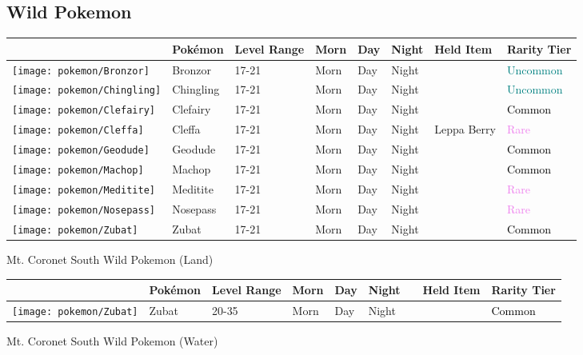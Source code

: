 \subsection{Wild Pokemon}%
\label{subsec:WildPokemon}%
\begin{longtable}{||l l l l l l l l||}%
\hline%
&Pokémon&Level Range&Morn&Day&Night&Held Item&Rarity Tier\\%
\hline%
\endhead%
\hline%
\texttt{[image: pokemon/Bronzor]}&Bronzor&17{-}21&Morn&Day&Night&&\textcolor{teal}{%
Uncommon%
}\\%
\hline%
\texttt{[image: pokemon/Chingling]}&Chingling&17{-}21&Morn&Day&Night&&\textcolor{teal}{%
Uncommon%
}\\%
\hline%
\texttt{[image: pokemon/Clefairy]}&Clefairy&17{-}21&Morn&Day&Night&&\textcolor{black}{%
Common%
}\\%
\hline%
\texttt{[image: pokemon/Cleffa]}&Cleffa&17{-}21&Morn&Day&Night&Leppa Berry&\textcolor{violet}{%
Rare%
}\\%
\hline%
\texttt{[image: pokemon/Geodude]}&Geodude&17{-}21&Morn&Day&Night&&\textcolor{black}{%
Common%
}\\%
\hline%
\texttt{[image: pokemon/Machop]}&Machop&17{-}21&Morn&Day&Night&&\textcolor{black}{%
Common%
}\\%
\hline%
\texttt{[image: pokemon/Meditite]}&Meditite&17{-}21&Morn&Day&Night&&\textcolor{violet}{%
Rare%
}\\%
\hline%
\texttt{[image: pokemon/Nosepass]}&Nosepass&17{-}21&Morn&Day&Night&&\textcolor{violet}{%
Rare%
}\\%
\hline%
\texttt{[image: pokemon/Zubat]}&Zubat&17{-}21&Morn&Day&Night&&\textcolor{black}{%
Common%
}\\%
\hline%
\end{longtable}%
\caption{Mt. Coronet South Wild Pokemon (Land)}%
\begin{longtable}{||l l l l l l l l l||}%
\hline%
&Pokémon&Level Range&Morn&Day&Night&&Held Item&Rarity Tier\\%
\hline%
\endhead%
\hline%
\texttt{[image: pokemon/Zubat]}&Zubat&20{-}35&Morn&Day&Night&&&\textcolor{black}{%
Common%
}\\%
\hline%
\end{longtable}%
\caption{Mt. Coronet South Wild Pokemon (Water)}%
